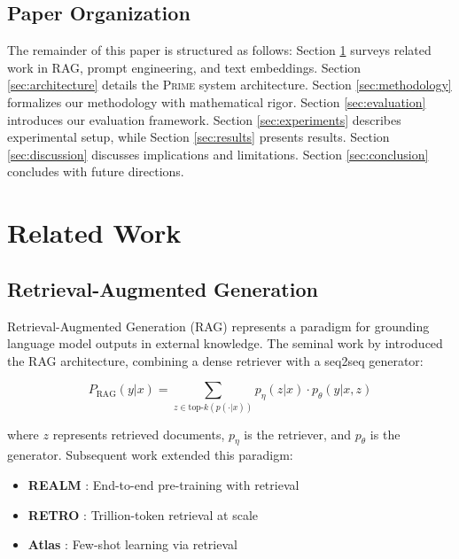 \documentclass[11pt,a4paper]{article}
\newcommand{\primesys}{\textsc{Prime}}
\begin{document}
\subsection{Paper Organization}

The remainder of this paper is structured as follows: Section \ref{sec:related} surveys related work in RAG, prompt engineering, and text embeddings. Section \ref{sec:architecture} details the \primesys{} system architecture. Section \ref{sec:methodology} formalizes our methodology with mathematical rigor. Section \ref{sec:evaluation} introduces our evaluation framework. Section \ref{sec:experiments} describes experimental setup, while Section \ref{sec:results} presents results. Section \ref{sec:discussion} discusses implications and limitations. Section \ref{sec:conclusion} concludes with future directions.

\section{Related Work}
\label{sec:related}

\subsection{Retrieval-Augmented Generation}

Retrieval-Augmented Generation (RAG) represents a paradigm for grounding language model outputs in external knowledge. The seminal work by \citet{lewis2020rag} introduced the RAG architecture, combining a dense retriever with a seq2seq generator:

\begin{equation}
P_{\text{RAG}}(y|x) = \sum_{z \in \text{top-}k(p(\cdot|x))} p_\eta(z|x) \cdot p_\theta(y|x,z)
\end{equation}

\noindent where $z$ represents retrieved documents, $p_\eta$ is the retriever, and $p_\theta$ is the generator. Subsequent work extended this paradigm:

\begin{itemize}
    \item \textbf{REALM} \cite{guu2020realm}: End-to-end pre-training with retrieval
    \item \textbf{RETRO} \cite{borgeaud2022retro}: Trillion-token retrieval at scale
    \item \textbf{Atlas} \cite{izacard2022atlas}: Few-shot learning via retrieval
\end{itemize}
\end{document}
